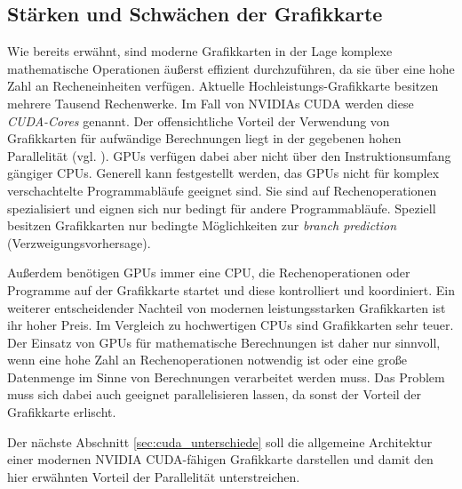 \documentclass[../main.tex]{subfiles}
\begin{document}
\subsection{Stärken und Schwächen der Grafikkarte} \label{sec:cuda_staerken}
Wie bereits erwähnt, sind moderne Grafikkarten in der Lage komplexe mathematische Operationen äußerst effizient durchzuführen, da sie über eine hohe Zahl an Recheneinheiten verfügen. Aktuelle Hochleistungs-Grafikkarte besitzen mehrere Tausend Rechenwerke. Im Fall von NVIDIAs CUDA werden diese \emph{CUDA-Cores} genannt. Der offensichtliche Vorteil der Verwendung von Grafikkarten für aufwändige Berechnungen liegt in der gegebenen hohen Parallelität (vgl. \cite{NVIDIA_HOMEPAGE}). GPUs verfügen dabei aber nicht über den Instruktionsumfang gängiger CPUs. Generell kann festgestellt werden, das GPUs nicht für komplex verschachtelte Programmabläufe geeignet sind. Sie sind auf Rechenoperationen spezialisiert und eignen sich nur bedingt für andere Programmabläufe. Speziell besitzen Grafikkarten nur bedingte Möglichkeiten zur \emph{branch prediction} (Verzweigungsvorhersage). \par Außerdem benötigen GPUs immer eine CPU, die Rechenoperationen oder Programme auf der Grafikkarte startet und diese kontrolliert und koordiniert. Ein weiterer entscheidender Nachteil von modernen leistungsstarken Grafikkarten ist ihr hoher Preis. Im Vergleich zu hochwertigen CPUs sind Grafikkarten sehr teuer. Der Einsatz von GPUs für mathematische Berechnungen ist daher nur sinnvoll, wenn eine hohe Zahl an Rechenoperationen notwendig ist oder eine große Datenmenge im Sinne von Berechnungen verarbeitet werden muss. Das Problem muss sich dabei auch geeignet parallelisieren lassen, da sonst der Vorteil der Grafikkarte erlischt. \par Der nächste Abschnitt \ref{sec:cuda_unterschiede} soll die allgemeine Architektur einer modernen NVIDIA CUDA-fähigen Grafikkarte darstellen und damit den hier erwähnten Vorteil der Parallelität unterstreichen. \par 
\end{document}

